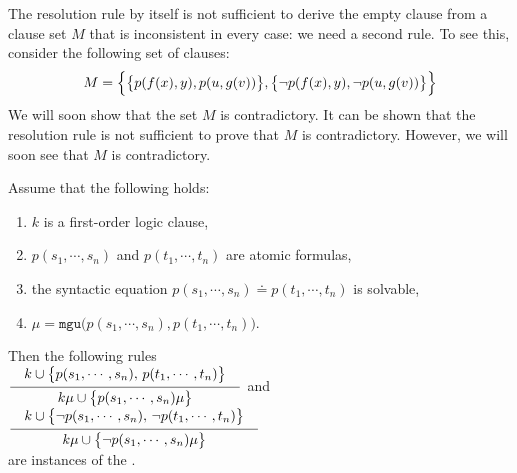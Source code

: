 The resolution rule by itself is not sufficient to derive the empty clause from a clause set $M$ that is
inconsistent in every case: we need a second rule. To see this, consider the following set of clauses:
\[ M = \Bigl\{ \bigl\{p(f(x),y), p(u,g(v))\bigr\}, 
               \bigl\{\neg p(f(x),y), \neg p(u,g(v))\bigr\} \Bigr\} 
\]
We will soon show that the set $M$ is contradictory. It can be shown that the resolution rule is not
sufficient to prove that $M$ is contradictory.
However, we will soon see that $M$ is contradictory. 

\begin{Definition} 
  Assume that the following holds:
  \begin{enumerate}
  \item $k$ is a first-order logic clause,
  \item $p(s_1,\cdots,s_n)$ and $p(t_1,\cdots,t_n)$ are atomic formulas,
  \item the syntactic equation $p(s_1,\cdots,s_n) \doteq p(t_1,\cdots,t_n)$ is solvable,
  \item $\mu = \mathtt{mgu}\bigl(p(s_1,\cdots,s_n), p(t_1,\cdots,t_n)\bigr)$.
  \end{enumerate}
  Then the following rules \\[0.3cm]
  \hspace*{0.8cm}
  $\schluss{k \cup \bigl\{p(s_1,\cdots,s_n),\, p(t_1,\cdots,t_n)\bigl\}}{k\mu \cup \bigl\{p(s_1,\cdots,s_n)\mu\bigr\} }$ 
  \quad and \quad
  $\schluss{k \cup \bigl\{ \neg p(s_1,\cdots,s_n),\, \neg p(t_1,\cdots,t_n)\bigl\}}{k\mu \cup \bigl\{\neg p(s_1,\cdots,s_n)\mu\bigr\} }$ 
  \\[0.3cm]
  are instances of the .
  \eox
\end{Definition}

